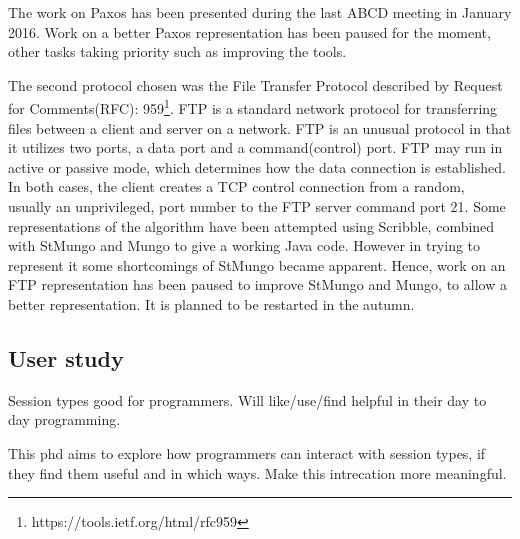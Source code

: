 The work on Paxos has been presented during the last ABCD meeting in January 2016. Work on a better Paxos representation has been paused for the moment, other tasks taking priority such as improving the tools.


The second protocol chosen was the File Transfer Protocol described by Request for Comments(RFC): 959\footnote{https://tools.ietf.org/html/rfc959}. FTP is a standard network protocol for transferring  files between a client and server on a network.  FTP is an unusual protocol in that it utilizes two ports, a data port and a command(control) port. FTP may run in active or passive mode, which determines how the data connection is established. In both cases, the client creates a TCP control connection from a random, usually an unprivileged, port number to the FTP server command port 21.
%
%
Some representations of the algorithm have been attempted using Scribble, combined with StMungo and Mungo to give a working Java code. However in trying to represent it some shortcomings of StMungo became apparent. Hence, work on an FTP representation has been paused to improve StMungo and Mungo, to allow a better representation. It is planned to be restarted in the autumn. 

\subsection{User study}
\label{us}


Session types good for programmers. Will like/use/find helpful in their day to day programming.

This phd aims to explore how programmers can interact with session types, if they find them useful and in which ways. Make this intrecation more meaningful.


